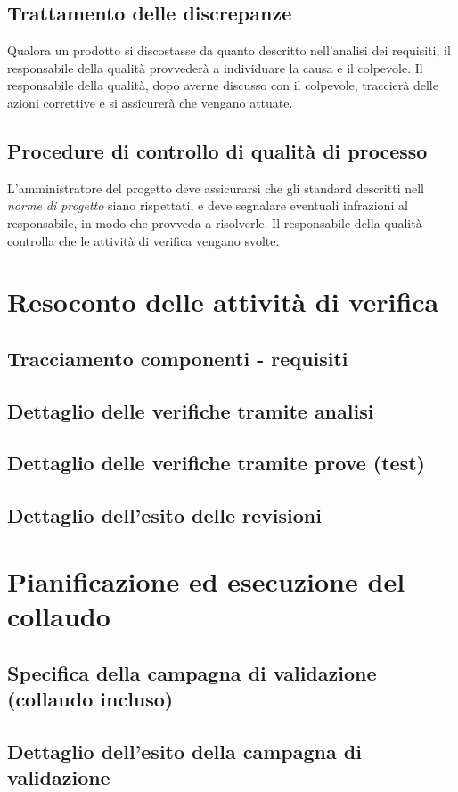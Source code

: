 \documentclass[a4paper]{article}
\begin{document}
\subsection{Trattamento delle discrepanze}
Qualora un prodotto si discostasse da quanto descritto nell'analisi dei requisiti, il responsabile della qualit\`a provveder\`a a individuare la causa e il colpevole. Il responsabile della qualit\`a, dopo averne discusso con il colpevole, traccier\`a delle azioni correttive e si assicurer\`a che vengano attuate.

\subsection{Procedure di controllo di qualit\`a di processo}
L'amministratore del progetto deve assicurarsi che gli standard descritti nell \textit{norme di progetto} siano rispettati, e deve segnalare eventuali infrazioni al responsabile, in modo che provveda a risolverle. Il responsabile della qualit\`a controlla che le attivit\`a di verifica vengano svolte.


\section{Resoconto delle attivit\`a di verifica}

\subsection{Tracciamento componenti - requisiti}
\subsection{Dettaglio delle verifiche tramite analisi}
\subsection{Dettaglio delle verifiche tramite prove (test)}
\subsection{Dettaglio dell'esito delle revisioni}


\section{Pianificazione ed esecuzione del collaudo}

\subsection{Specifica della campagna di validazione (collaudo incluso)}
\subsection{Dettaglio dell'esito della campagna di validazione}
\end{document}
